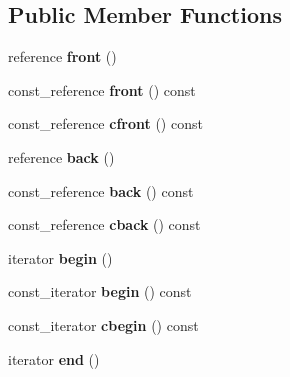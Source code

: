 \subsection*{Public Member Functions}
\begin{DoxyCompactItemize}
\item 
\mbox{\label{classradix_1_1Equation_a3fce338abc1152dd32c9d91be064847a}} 
reference {\bfseries front} ()
\item 
\mbox{\label{classradix_1_1Equation_afcfe55da13a33f91a6d144337319659a}} 
const\+\_\+reference {\bfseries front} () const
\item 
\mbox{\label{classradix_1_1Equation_aa1206fe0f6caaf9a47fee7e57c66c0e9}} 
const\+\_\+reference {\bfseries cfront} () const
\item 
\mbox{\label{classradix_1_1Equation_af282cd564c82981448bc0fcdc9b056cc}} 
reference {\bfseries back} ()
\item 
\mbox{\label{classradix_1_1Equation_a5f5da71f14a54b605d17a39aa4b539a6}} 
const\+\_\+reference {\bfseries back} () const
\item 
\mbox{\label{classradix_1_1Equation_ae39cec445f3dc63cb1aadd2e5bcf9c8e}} 
const\+\_\+reference {\bfseries cback} () const
\item 
\mbox{\label{classradix_1_1Equation_a8969ede3db3237d74b893beb2a3ad516}} 
iterator {\bfseries begin} ()
\item 
\mbox{\label{classradix_1_1Equation_a26e3c7e211b1290ac5a5ad4633594c99}} 
const\+\_\+iterator {\bfseries begin} () const
\item 
\mbox{\label{classradix_1_1Equation_ad700ce46a4e31c3fd91144711ab372be}} 
const\+\_\+iterator {\bfseries cbegin} () const
\item 
\mbox{\label{classradix_1_1Equation_aafd68b8b541b17af7fa7bbe54620aa1a}} 
iterator {\bfseries end} ()
\item 

\end{DoxyCompactItemize}
